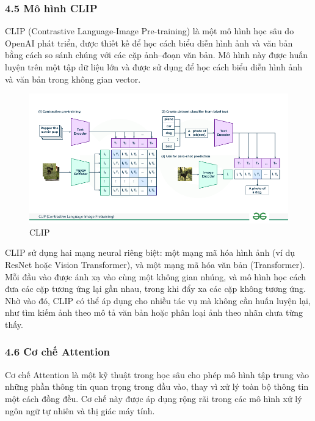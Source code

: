 \documentclass[../main.tex]{subfiles}
\begin{document}
\subsubsection*{4.5 Mô hình CLIP}

CLIP (Contrastive Language-Image Pre-training) là một mô hình học sâu do OpenAI phát triển, được thiết kế để học cách biểu diễn hình ảnh và văn bản bằng cách so sánh chúng với các cặp ảnh–đoạn văn bản. Mô hình này được huấn luyện trên một tập dữ liệu lớn và được sử dụng để học cách biểu diễn hình ảnh và văn bản trong không gian vector.

\begin{figure}[H]
    \centering
    \includegraphics[width=1\textwidth]{Image/CLIP.png}
    \caption{CLIP}
    \label{fig:CLIP}
\end{figure}

CLIP sử dụng hai mạng neural riêng biệt: một mạng mã hóa hình ảnh (ví dụ ResNet hoặc Vision Transformer), và một mạng mã hóa văn bản (Transformer). Mỗi đầu vào được ánh xạ vào cùng một không gian nhúng, và mô hình học cách đưa các cặp tương ứng lại gần nhau, trong khi đẩy xa các cặp không tương ứng. Nhờ vào đó, CLIP có thể áp dụng cho nhiều tác vụ mà không cần huấn luyện lại, như tìm kiếm ảnh theo mô tả văn bản hoặc phân loại ảnh theo nhãn chưa từng thấy.

\subsubsection*{4.6 Cơ chế Attention}

Cơ chế Attention là một kỹ thuật trong học sâu cho phép mô hình tập trung vào những phần thông tin quan trọng trong đầu vào, thay vì xử lý toàn bộ thông tin một cách đồng đều. Cơ chế này được áp dụng rộng rãi trong các mô hình xử lý ngôn ngữ tự nhiên và thị giác máy tính.
\end{document}
